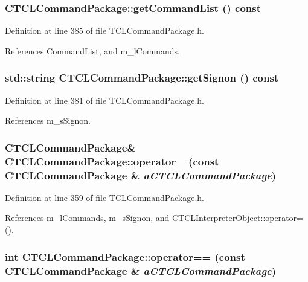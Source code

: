 \subsubsection{ CTCLCommand\-Package::get\-Command\-List () const\hspace{0.3cm}{\tt  [inline]}}\label{classCTCLCommandPackage_a7}




Definition at line 385 of file TCLCommand\-Package.h.

References Command\-List, and m\_\-l\-Commands.
\subsubsection{\setlength{\rightskip}{0pt plus 5cm}std::string CTCLCommand\-Package::get\-Signon () const\hspace{0.3cm}{\tt  [inline]}}\label{classCTCLCommandPackage_a6}




Definition at line 381 of file TCLCommand\-Package.h.

References m\_\-s\-Signon.
\subsubsection{\setlength{\rightskip}{0pt plus 5cm}CTCLCommand\-Package\& CTCLCommand\-Package::operator= (const CTCLCommand\-Package \& {\em a\-CTCLCommand\-Package})\hspace{0.3cm}{\tt  [inline]}}\label{classCTCLCommandPackage_a4}




Definition at line 359 of file TCLCommand\-Package.h.

References m\_\-l\-Commands, m\_\-s\-Signon, and CTCLInterpreter\-Object::operator=().
\subsubsection{\setlength{\rightskip}{0pt plus 5cm}int CTCLCommand\-Package::operator== (const CTCLCommand\-Package \& {\em a\-CTCLCommand\-Package})\hspace{0.3cm}{\tt  [inline]}}\label{classCTCLCommandPackage_a5}




